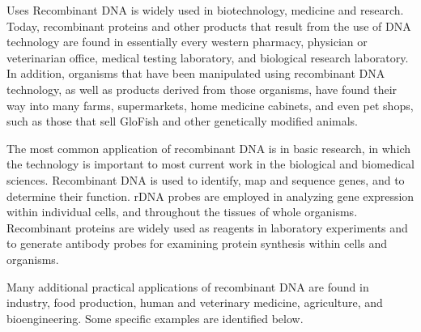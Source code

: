 Uses
Recombinant DNA is widely used in biotechnology, medicine and research. Today, recombinant proteins and other products that result from the use of DNA technology are found in essentially every western pharmacy, physician or veterinarian office, medical testing laboratory, and biological research laboratory. In addition, organisms that have been manipulated using recombinant DNA technology, as well as products derived from those organisms, have found their way into many farms, supermarkets, home medicine cabinets, and even pet shops, such as those that sell GloFish and other genetically modified animals.

The most common application of recombinant DNA is in basic research, in which the technology is important to most current work in the biological and biomedical sciences. Recombinant DNA is used to identify, map and sequence genes, and to determine their function. rDNA probes are employed in analyzing gene expression within individual cells, and throughout the tissues of whole organisms. Recombinant proteins are widely used as reagents in laboratory experiments and to generate antibody probes for examining protein synthesis within cells and organisms.

Many additional practical applications of recombinant DNA are found in industry, food production, human and veterinary medicine, agriculture, and bioengineering. Some specific examples are identified below.

